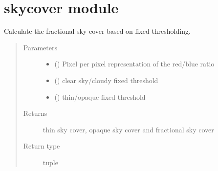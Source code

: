\documentclass[letterpaper,10pt,english]{sphinxmanual}
\begin{document}
\section{skycover module}
\label{\detokenize{skycover:skycover-module}}\label{\detokenize{skycover::doc}}\label{\detokenize{skycover:module-skycover}}

\begin{fulllineitems}
\label{\detokenize{skycover:skycover.fixed}}
Calculate the fractional sky cover based on fixed thresholding.
\begin{quote}\begin{description}
\item[{Parameters}] \leavevmode\begin{itemize}
\item {} 
 () \textendash{} Pixel per pixel representation of the red/blue ratio

\item {} 
 () \textendash{} clear sky/cloudy fixed threshold

\item {} 
 () \textendash{} thin/opaque fixed threshold

\end{itemize}

\item[{Returns}] \leavevmode
thin sky cover, opaque sky cover and fractional sky cover

\item[{Return type}] \leavevmode
tuple

\end{description}\end{quote}

\end{fulllineitems}

\end{document}
